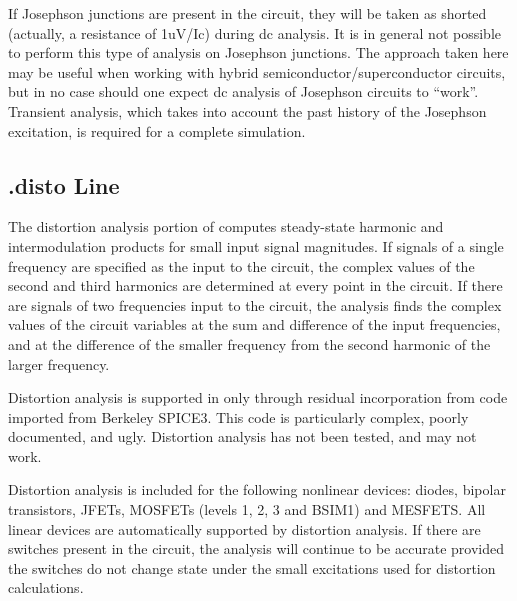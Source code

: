 If Josephson junctions are present in the circuit, they will be taken
as shorted (actually, a resistance of 1uV/Ic) during dc analysis. 
It is in general not possible to perform this type of analysis on
Josephson junctions.  The approach taken here may be useful when
working with hybrid semiconductor/superconductor circuits, but in no
case should one expect dc analysis of Josephson circuits to ``work''. 
Transient analysis, which takes into account the past history of the
Josephson excitation, is required for a complete simulation.

\subsection{{\vt .disto} Line}
\label{distoline}


The distortion analysis portion of {\WRspice} computes steady-state
harmonic and intermodulation products for small input signal
magnitudes.  If signals of a single frequency are specified as the
input to the circuit, the complex values of the second and third
harmonics are determined at every point in the circuit.  If there are
signals of two frequencies input to the circuit, the analysis finds
the complex values of the circuit variables at the sum and difference
of the input frequencies, and at the difference of the smaller
frequency from the second harmonic of the larger frequency.

Distortion analysis is supported in {\WRspice} only through
residual incorporation from code imported from Berkeley SPICE3.  This
code is particularly complex, poorly documented, and ugly.  Distortion
analysis has not been tested, and may not work.

Distortion analysis is included for the following nonlinear devices: 
diodes, bipolar transistors, JFETs, MOSFETs (levels 1, 2, 3 and BSIM1)
and MESFETS.  All linear devices are automatically supported by
distortion analysis.  If there are switches present in the circuit,
the analysis will continue to be accurate provided the switches do not
change state under the small excitations used for distortion
calculations.


